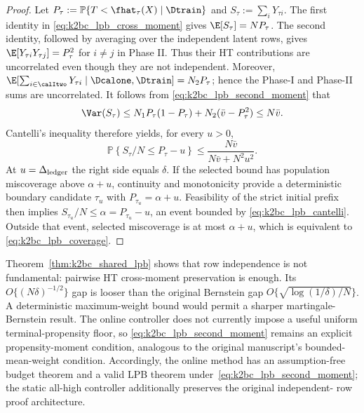 \begin{proof}
Let $P_\tau:=\mathbb P\{T<\fhat_\tau(X)\mid\Dtrain\}$ and
$S_\tau:=\sum_iY_{\tau i}$.  The first identity in
\eqref{eq:k2bc_lpb_cross_moment} gives
$\E[S_\tau]=NP_\tau$.  The second identity, followed by averaging over the
independent latent rows, gives
$\E[Y_{\tau i}Y_{\tau j}]=P_\tau^2$ for $i\ne j$ in Phase II.  Thus their
HT contributions are uncorrelated even though they are not independent.
Moreover,
$\E[\sum_{i\in\calItwo}Y_{\tau i}\mid\Dcalone,\Dtrain]=N_2P_\tau$;
hence the Phase-I and Phase-II sums are uncorrelated.  It follows from
\eqref{eq:k2bc_lpb_second_moment} that
\begin{equation}
 \Var(S_\tau)
 \leq N_1P_\tau(1-P_\tau)
      +N_2(\bar v-P_\tau^2)
 \leq N\bar v.
 \label{eq:k2bc_lpb_variance_bound}
\end{equation}
Cantelli's inequality therefore yields, for every $u>0$,
\begin{equation}
 \mathbb P\!\left\{S_\tau/N\leq P_\tau-u\right\}
 \leq\frac{N\bar v}{N\bar v+N^2u^2}.
 \label{eq:k2bc_lpb_cantelli}
\end{equation}
At $u=\Delta_{\rm ledger}$ the right side equals $\delta$.  If the selected
bound has population miscoverage above $\alpha+u$, continuity and
monotonicity provide a deterministic boundary candidate $\tau_u$ with
$P_{\tau_u}=\alpha+u$.  Feasibility of the strict initial prefix then implies
$S_{\tau_u}/N\leq\alpha=P_{\tau_u}-u$, an event bounded by
\eqref{eq:k2bc_lpb_cantelli}.  Outside that event, selected miscoverage is at
most $\alpha+u$, which is equivalent to
\eqref{eq:k2bc_lpb_coverage}.
\end{proof}

Theorem~\ref{thm:k2bc_shared_lpb} shows that row independence is not
fundamental: pairwise HT cross-moment preservation is enough.  Its
$O\{(N\delta)^{-1/2}\}$ gap is looser than the original Bernstein gap
$O\{\sqrt{\log(1/\delta)/N}\}$.  A deterministic maximum-weight bound would
permit a sharper martingale-Bernstein result.  The online controller does not
currently impose a useful uniform terminal-propensity floor, so
\eqref{eq:k2bc_lpb_second_moment} remains an explicit propensity-moment
condition, analogous to the original manuscript's bounded-mean-weight
condition.  Accordingly, the online method has an assumption-free budget
theorem and a valid LPB theorem under~\eqref{eq:k2bc_lpb_second_moment}; the
static all-high controller additionally preserves the original independent-
row proof architecture.

